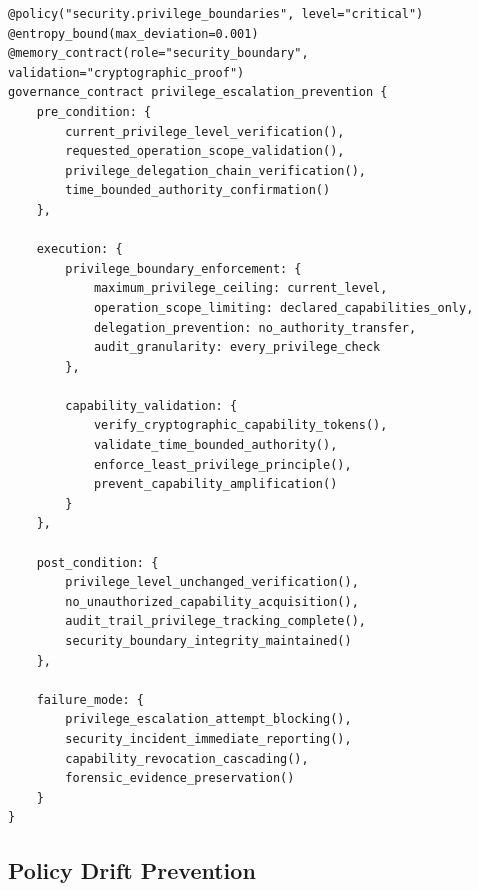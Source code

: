\documentclass[11pt,letterpaper]{article}
\begin{document}
\begin{lstlisting}[language=rift, caption=Anti-Privilege Escalation Contract Pattern]
@policy("security.privilege_boundaries", level="critical")
@entropy_bound(max_deviation=0.001)
@memory_contract(role="security_boundary", validation="cryptographic_proof")
governance_contract privilege_escalation_prevention {
    pre_condition: {
        current_privilege_level_verification(),
        requested_operation_scope_validation(),
        privilege_delegation_chain_verification(),
        time_bounded_authority_confirmation()
    },
    
    execution: {
        privilege_boundary_enforcement: {
            maximum_privilege_ceiling: current_level,
            operation_scope_limiting: declared_capabilities_only,
            delegation_prevention: no_authority_transfer,
            audit_granularity: every_privilege_check
        },
        
        capability_validation: {
            verify_cryptographic_capability_tokens(),
            validate_time_bounded_authority(),
            enforce_least_privilege_principle(),
            prevent_capability_amplification()
        }
    },
    
    post_condition: {
        privilege_level_unchanged_verification(),
        no_unauthorized_capability_acquisition(),
        audit_trail_privilege_tracking_complete(),
        security_boundary_integrity_maintained()
    },
    
    failure_mode: {
        privilege_escalation_attempt_blocking(),
        security_incident_immediate_reporting(),
        capability_revocation_cascading(),
        forensic_evidence_preservation()
    }
}
\end{lstlisting}

\subsection{Policy Drift Prevention}
\end{document}
